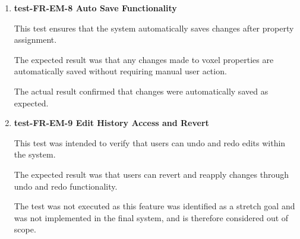 \documentclass[12pt, titlepage]{article}
\begin{document}
\begin{enumerate}
\hspace{1.5em} This test was intended to verify that properties can be copied from one layer to another.

The expected result was that selected properties are replicated accurately across layers.

The test was not executed as this feature was identified as a stretch goal and was not implemented in the final system, and is therefore considered out of scope.


\item \textbf{test-FR-EM-8 Auto Save Functionality}

\hspace{1.5em} This test ensures that the system automatically saves changes after property assignment.

The expected result was that any changes made to voxel properties are automatically saved without requiring manual user action.

The actual result confirmed that changes were automatically saved as expected.



\item \textbf{test-FR-EM-9 Edit History Access and Revert}

\hspace{1.5em} This test was intended to verify that users can undo and redo edits within the system.

The expected result was that users can revert and reapply changes through undo and redo functionality.

The test was not executed as this feature was identified as a stretch goal and was not implemented in the final system, and is therefore considered out of scope.


\end{enumerate}
\end{document}
